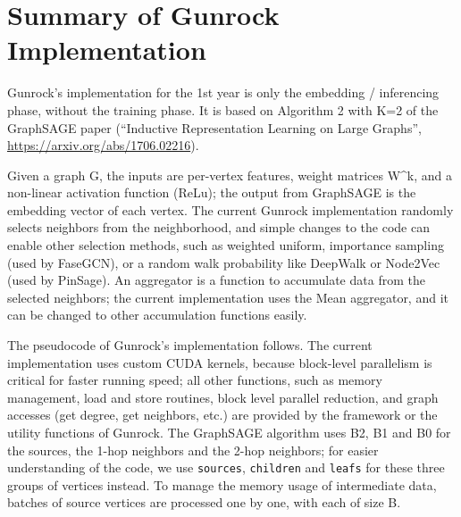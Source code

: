 \documentclass[10pt,oneside]{memoir}
\begin{document}
\hypertarget{summary-of-gunrock-implementation-1}{%
\section{Summary of Gunrock
Implementation}\label{summary-of-gunrock-implementation-1}}

Gunrock's implementation for the 1st year is only the embedding /
inferencing phase, without the training phase. It is based on Algorithm
2 with K=2 of the GraphSAGE paper (``Inductive Representation Learning
on Large Graphs'', \url{https://arxiv.org/abs/1706.02216}).

Given a graph G, the inputs are per-vertex features, weight matrices
W\^{}k, and a non-linear activation function (ReLu); the output from
GraphSAGE is the embedding vector of each vertex. The current Gunrock
implementation randomly selects neighbors from the neighborhood, and
simple changes to the code can enable other selection methods, such as
weighted uniform, importance sampling (used by FaseGCN), or a random
walk probability like DeepWalk or Node2Vec (used by PinSage). An
aggregator is a function to accumulate data from the selected neighbors;
the current implementation uses the Mean aggregator, and it can be
changed to other accumulation functions easily.

The pseudocode of Gunrock's implementation follows. The current
implementation uses custom CUDA kernels, because block-level parallelism
is critical for faster running speed; all other functions, such as
memory management, load and store routines, block level parallel
reduction, and graph accesses (get degree, get neighbors, etc.) are
provided by the framework or the utility functions of Gunrock. The
GraphSAGE algorithm uses B2, B1 and B0 for the sources, the 1-hop
neighbors and the 2-hop neighbors; for easier understanding of the code,
we use \texttt{sources}, \texttt{children} and \texttt{leafs} for these
three groups of vertices instead. To manage the memory usage of
intermediate data, batches of source vertices are processed one by one,
with each of size B.
\end{document}
